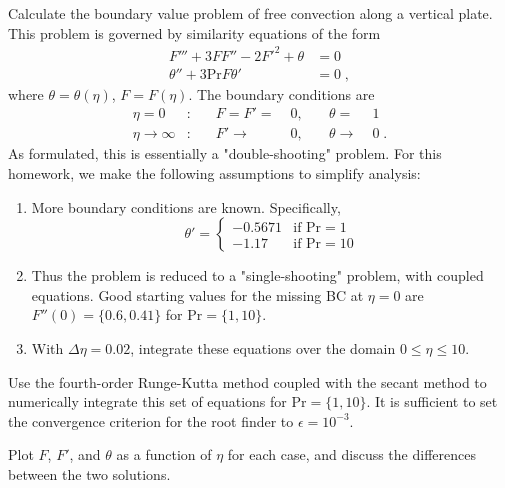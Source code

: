 \documentclass[12pt]{article}
\begin{document}
Calculate the boundary value problem of free convection along a vertical plate. This problem is governed by similarity equations of the form
\begin{equation}
\begin{aligned}
F''' + 3 F F'' - 2F'^2 + \theta &= 0 \\
\theta'' + 3 \text{Pr} F \theta' &= 0
\;,
\end{aligned}
\end{equation}
where $\theta = \theta(\eta)$, $F = F(\eta)$. The boundary conditions are
\begin{equation}
\begin{aligned}
\eta = 0 &: &\quad F = F' =\; &0, &\quad \theta =\; &1 \\
\eta \rightarrow \infty &: &\quad F' \rightarrow\; &0, &\quad \theta \rightarrow\; &0
\;.
\end{aligned}
\end{equation}
As formulated, this is essentially a "double-shooting" problem. For this homework, we make the following assumptions to simplify analysis:
\begin{enumerate}
\item More boundary conditions are known. Specifically,
\begin{equation}
\theta' =
\begin{cases}
-0.5671 &\text{if Pr} = 1 \\
-1.17 &\text{if Pr} = 10
\end{cases}
\end{equation}
\item Thus the problem is reduced to a "single-shooting" problem, with coupled equations. Good starting values for the missing BC at $\eta = 0$ are $F''(0) = \{0.6, 0.41\}$ for $\text{Pr} = \{1, 10\}$.
\item With $\Delta\eta = 0.02$, integrate these equations over the domain $0 \le \eta \le 10$.
\end{enumerate}

Use the fourth-order Runge-Kutta method coupled with the secant method to numerically integrate this set of equations for $\text{Pr} = \{1,10\}$. It is sufficient to set the convergence criterion for the root finder to $\epsilon = 10^{-3}$.

Plot $F$, $F'$, and $\theta$ as a function of $\eta$ for each case, and discuss the differences between the two solutions.

\end{document}
